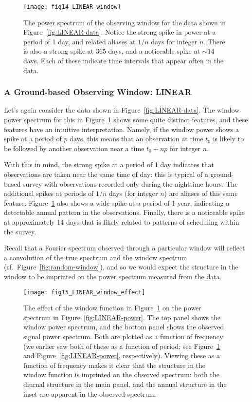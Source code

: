 \documentclass[preprint]{aastex}
\newcommand{\fig}[1]{Figure~\ref{fig:#1}}
\newcommand{\figlabel}[1]{\label{fig:#1}}
\begin{document}
\begin{figure}[ht]
  \centering
  \texttt{[image: fig14\_LINEAR\_window]}
  \caption{The power spectrum of the observing window for the data shown
    in \fig{LINEAR-data}. Notice the strong spike in power at a period of
    1 day, and related aliases at $1/n$ days for integer $n$.
    There is also a strong spike at $365$ days, and a noticeable spike at
    $\sim 14$ days. Each of these indicate time intervals that appear often
    in the data.
    \figlabel{LINEAR-window}}
\end{figure}

\subsubsection{A Ground-based Observing Window: LINEAR}

Let's again consider the data shown in \fig{LINEAR-data}. The window power
spectrum for this in \fig{LINEAR-window} shows some quite distinct features,
and these features have an intuitive interpretation.
Namely, if the window power shows a spike at a period of $p$ days, this means
that an observation at time $t_0$ is likely to be followed by another
observation near a time $t_0 + np$ for integer $n$.

With this in mind, the strong spike at a period of 1 day indicates
that observations are
taken near the same time of day: this is typical of a ground-based survey
with observations recorded only during the nighttime hours.
The additional spikes at periods of $1/n$ days (for integer $n$) are aliases
of this same feature.
\fig{LINEAR-window} also shows a wide spike at a period of 1 year, indicating
a detectable annual pattern in the observations.
Finally, there is a noticeable spike at approximately 14 days that is likely
related to patterns of scheduling within the survey.

Recall that a Fourier spectrum observed through a particular window will reflect
a convolution of the true spectrum and the window spectrum
(cf.\ \fig{random-window}), and so we would expect the structure in the window
to be imprinted on the power spectrum measured from the data.

\begin{figure}[ht]
  \centering
  \texttt{[image: fig15\_LINEAR\_window\_effect]}
  \caption{The effect of the window function in \fig{LINEAR-window} on the
    power spectrum in \fig{LINEAR-power}.
    The top panel shows the window power spectrum, and the bottom panel shows
    the observed signal power spectrum.
    Both are plotted as a function of frequency (we earlier saw both of these
    as a function of period; see \fig{LINEAR-window} and \fig{LINEAR-power},
    respectively).
    Viewing these as a function of frequency makes it clear that the structure
    in the window function is imprinted on the observed spectrum: both the
    diurnal structure in the main panel, and the annual structure in the inset
    are apparent in the observed spectrum.
    \figlabel{LINEAR-window-effect}}
\end{figure}
\end{document}
